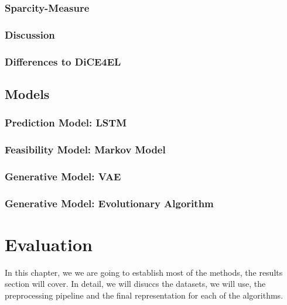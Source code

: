 \documentclass[12pt,a4paper]{report}
\begin{document}
\subsection{Sparcity-Measure}


\subsection{Discussion}


\subsection{Differences to DiCE4EL}

 

\section{Models}
\label{sec:models}

\subsection{Prediction Model: LSTM}
\label{sec:model_prediction}


\subsection{Feasibility Model: Markov Model}
\label{sec:model_feasibility}


\subsection{Generative Model: VAE}
\label{sec:model_vae}


\subsection{Generative Model: Evolutionary Algorithm}
\label{sec:model_evolutionary}


\chapter{Evaluation}
\label{sec:datasets}
In this chapter, we we are going to establish most of the methods, the results section will cover. In detail, we will disuccs the datasets, we will use, the preprocessing pipeline and the final representation for each of the algorithms.
\end{document}
